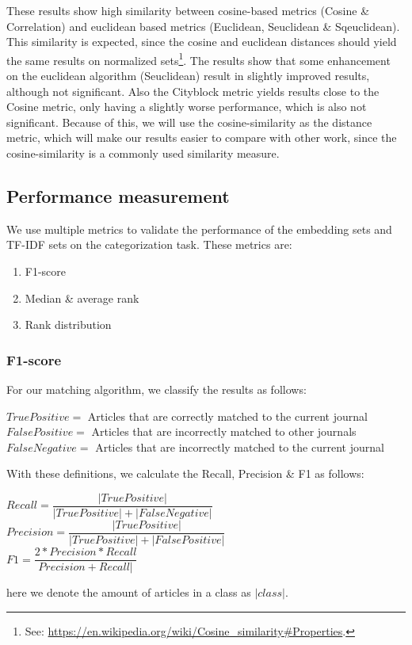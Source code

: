 \documentclass[../../Thesis.tex]{subfiles}
\begin{document}
These results show high similarity between cosine-based metrics (Cosine \& Correlation) and euclidean based metrics (Euclidean, Seuclidean \& Sqeuclidean). This similarity is expected, since the cosine and euclidean distances should yield the same results on normalized sets\footnote{See: \url{https://en.wikipedia.org/wiki/Cosine_similarity\#Properties}.}. The results show that some enhancement on the euclidean algorithm (Seuclidean) result in slightly improved results, although not significant. Also the Cityblock metric yields results close to the Cosine metric, only having a slightly worse performance, which is also not significant. Because of this, we will use the cosine-similarity as the distance metric, which will make our results easier to compare with other work, since the cosine-similarity is a commonly used similarity measure.
\subsection{Performance measurement}
We use multiple metrics to validate the performance of the embedding sets and TF-IDF sets on the categorization task. These metrics are:
\begin{enumerate}
\item{F1-score}
\item{Median \& average rank}
\item{Rank distribution}
\end{enumerate}
\subsubsection{F1-score}
For our matching algorithm, we classify the results as follows:
\begin{jumpin}
$True Positive = $ Articles that are correctly matched to the current journal\\
$False Positive = $ Articles that are incorrectly matched to other journals\\
$False Negative = $ Articles that are incorrectly matched to the current journal\\
\end{jumpin}
With these definitions, we calculate the Recall, Precision \& F1 as follows:\\
\begin{jumpin}
$Recall = \dfrac{|True Positive|}{|True Positive| + |False Negative|}$\vspace{0.1in}\\
$Precision = \dfrac{|True Positive|}{|True Positive| + |False Positive|}$\vspace{0.1in}\\
$F1 = \dfrac{2 * Precision * Recall}{Precision + Recall|}$
\end{jumpin}
here we denote the amount of articles in a class as $|class|$.
\end{document}
